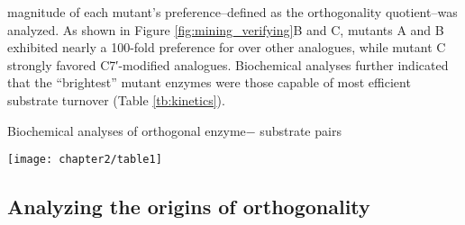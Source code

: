 magnitude of each mutant’s preference--defined as the
orthogonality quotient--was analyzed. As shown in Figure
\ref{fig:mining_verifying}B and C, mutants A and B exhibited nearly a 100-fold preference for  over other analogues, while mutant C strongly favored C7′-modified analogues. Biochemical analyses further indicated that the “brightest”
mutant enzymes were those capable of most efficient substrate
turnover (Table \ref{tb:kinetics}).
\begin{table}
  \caption{Biochemical analyses of orthogonal enzyme−
substrate pairs}
\texttt{[image: chapter2/table1]}
\centering
  \label{tb:kinetics}
\end{table}

\subsection*{Analyzing the origins of orthogonality}

